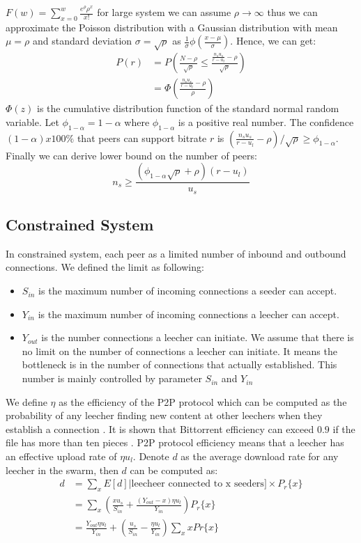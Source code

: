 \documentclass[paper]{ieice}
\begin{document}
$F(w) = \sum_{x=0}^{w}\frac{e^{\rho}\rho^{x}}{x!}$ for large system we can assume $\rho \rightarrow \infty$ thus we can approximate the Poisson distribution with a Gaussian distribution with mean $\mu = \rho$ and standard deviation $\sigma = \sqrt{\rho}$ as $\frac{1}{\sigma}\phi(\frac{x-\mu}{\sigma})$.
Hence, we can get:
\begin{align*}
	P(r) &= P(\frac{N-\rho}{\sqrt{\rho}} \le \frac{\frac{n_s u_s}{r - u_l}- \rho}{\sqrt{\rho}}) \\
	&= \Phi(\frac{ \frac{n_s u_s}{r - u_l} - \rho}{\rho})
\end{align*}
$\Phi(z)$ is the cumulative distribution function of the standard normal random variable.
Let $\phi_{1-\alpha}=1 - \alpha$ where $\phi_{1-\alpha}$ is a positive real number.
The confidence $(1-\alpha) x 100 \%$ that peers can support bitrate $r$ is $(\frac{n_s u_s}{r - u_l} - \rho)/ \sqrt{\rho} \ge \phi_{1-\alpha}$.
Finally we can derive lower bound on the number of peers:
\begin{equation}
	n_s \ge \frac{(\phi_{1-\alpha} \sqrt{\rho} + \rho)(r - u_l)}{u_s}
\end{equation}

\subsection{Constrained System}
In constrained system, each peer as a limited number of inbound and outbound connections. 
We defined the limit as following:
\begin{itemize}
	\item $S_{in}$ is the maximum number of incoming connections a seeder can accept.
	\item $Y_{in}$ is the maximum number of incoming connections a leecher can accept.
	\item $Y_{out}$ is the number connections a leecher can initiate. We assume that there is no limit on the number of connections a leecher can initiate.
	It means the bottleneck is in the number of connections that actually established. 
	This number is mainly controlled by parameter $S_{in}$ and $Y_{in}$
\end{itemize}

We define $\eta$ as the efficiency of the P2P protocol which can be computed as the probability of any leecher finding new content at other leechers when they establish a connection \cite{Qiu:2004:MPA:1030194.1015508}.
It is shown that Bittorrent efficiency can exceed $0.9$ if the file has more than ten pieces \cite{4199285}.
P2P protocol efficiency means that a leecher has an effective upload rate of $\eta u_l$.
Denote $d$ as the average download rate for any leecher in the swarm, then $d$ can be computed as:
\begin{align*}
	d &= \sum_{x} E[d] | \text{leecheer connected to x seeders}] \times P_r\{x\} \\
	&= \sum_{x} (\frac{xu_s}{S_{in}} + \frac{(Y_{out}-x) \eta u_l}{Y_{in}}) P_r\{x\} \\
	&= \frac{Y_{out} \eta u_l}{Y_{in}} + ( \frac{u_s}{S_{in}} - \frac{\eta u_l}{Y_{in}} ) \sum_x x Pr\{x\}
\end{align*}
\end{document}
